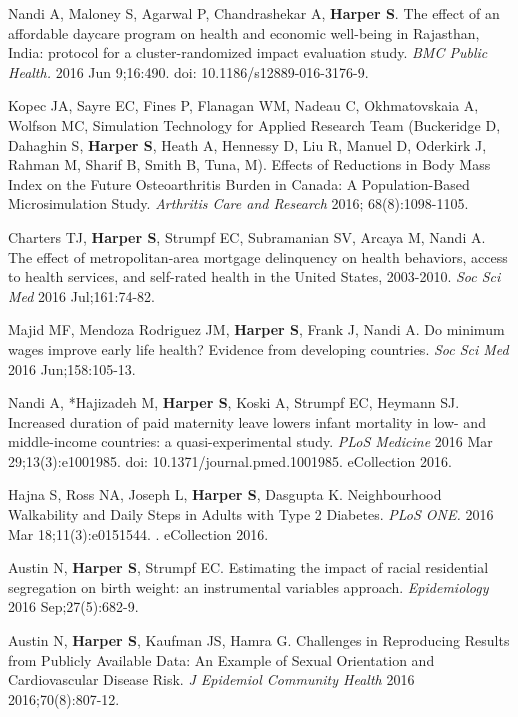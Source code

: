 \documentclass[
  letterpaper,
  DIV=11,
  numbers=noendperiod]{scrartcl}
\begin{document}
\begin{etaremune}
\item Nandi A, Maloney S, Agarwal P, Chandrashekar A, \textbf{Harper S}. The effect of an affordable daycare program on health and economic well-being in Rajasthan, India: protocol for a cluster-randomized impact evaluation study. \emph{BMC Public Health.} 2016 Jun 9;16:490. doi: 10.1186/s12889-016-3176-9.
 
\item Kopec JA, Sayre EC, Fines P, Flanagan WM, Nadeau C, Okhmatovskaia A, Wolfson MC, Simulation Technology for Applied Research Team (Buckeridge D, Dahaghin S, \textbf{Harper S}, Heath A, Hennessy D,  Liu R, Manuel D, Oderkirk J, Rahman M,  Sharif B, Smith B, Tuna, M). Effects of Reductions in Body Mass Index on the Future Osteoarthritis Burden in Canada: A Population-Based Microsimulation Study. \emph{Arthritis Care and Research} 2016; 68(8):1098-1105.
 
\item Charters TJ, \textbf{Harper S}, Strumpf EC, Subramanian SV, Arcaya M, Nandi A. The effect of metropolitan-area mortgage delinquency on health behaviors, access to health services, and self-rated health in the United States, 2003-2010. \emph{Soc Sci Med} 2016 Jul;161:74-82.
 
\item *Majid MF, Mendoza Rodriguez JM, \textbf{Harper S}, Frank J, Nandi A. Do minimum wages improve early life health? Evidence from developing countries. \emph{Soc Sci Med} 2016 Jun;158:105-13.
 
\item Nandi A, *Hajizadeh M, \textbf{Harper S}, Koski A, Strumpf EC, Heymann SJ. Increased duration of paid maternity leave lowers infant mortality in low- and middle-income countries: a quasi-experimental study. \emph{PLoS Medicine} 2016 Mar 29;13(3):e1001985. doi: 10.1371/journal.pmed.1001985. eCollection 2016.
 
\item Hajna S, Ross NA, Joseph L, \textbf{Harper S}, Dasgupta K. Neighbourhood Walkability and Daily Steps in Adults with Type 2 Diabetes. \emph{PLoS ONE.} 2016 Mar 18;11(3):e0151544. . eCollection 2016.
 
\item *Austin N, \textbf{Harper S}, Strumpf EC. Estimating the impact of racial residential segregation on birth weight: an instrumental variables approach. \emph{Epidemiology} 2016 Sep;27(5):682-9.
 
\item *Austin N, \textbf{Harper S}, Kaufman JS, Hamra G. Challenges in Reproducing Results from Publicly Available Data: An Example of Sexual Orientation and Cardiovascular Disease Risk. \emph{J Epidemiol Community Health} 2016 2016;70(8):807-12.
 

\end{etaremune}
\end{document}
